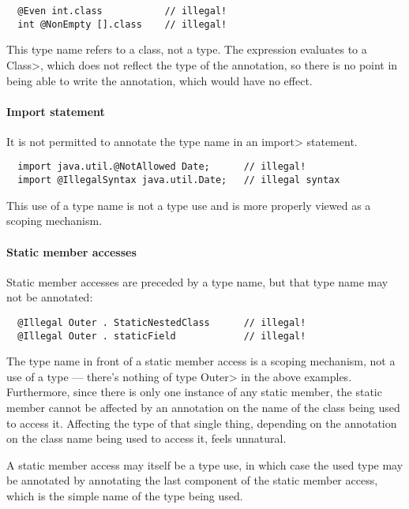 \documentclass[10pt]{article}
\begin{document}
\preverbnegspace
\begin{Verbatim}
  @Even int.class           // illegal!
  int @NonEmpty [].class    // illegal!
\end{Verbatim}
\preverbnegspace

\noindent
This type name refers to a class, not a type.  The expression evaluates to a
\<Class>, which does not reflect the type of the annotation, so there is no
point in being able to write the annotation, which would have no effect.

\paragraph{Import statement}
It is not permitted to annotate the type name in an \<import> statement.

\preverbnegspace
\begin{Verbatim}
  import java.util.@NotAllowed Date;      // illegal!
  import @IllegalSyntax java.util.Date;   // illegal syntax
\end{Verbatim}
\preverbnegspace

\noindent
This use of a type name is not a type use and is more properly viewed as
a scoping mechanism.

\paragraph{Static member accesses}

Static member accesses are preceded by a type name, but that type name may
not be annotated:

\preverbnegspace
\begin{Verbatim}
  @Illegal Outer . StaticNestedClass      // illegal!
  @Illegal Outer . staticField            // illegal!
\end{Verbatim}
\preverbnegspace

The type name in front of a static member access is a scoping mechanism,
not a use of a type --- there's nothing of type \<Outer> in the above
examples.  Furthermore, since there is only one instance of any static
member, the static member cannot be affected by an annotation on the name of
the class being used to access it.  Affecting the type of that single
thing, depending on the annotation on the class name being used to access
it, feels unnatural.

A static member access may itself be a type use, in which case the used
type may be annotated by annotating the last component of the static member
access, which is the simple name of the type being used.
\end{document}
